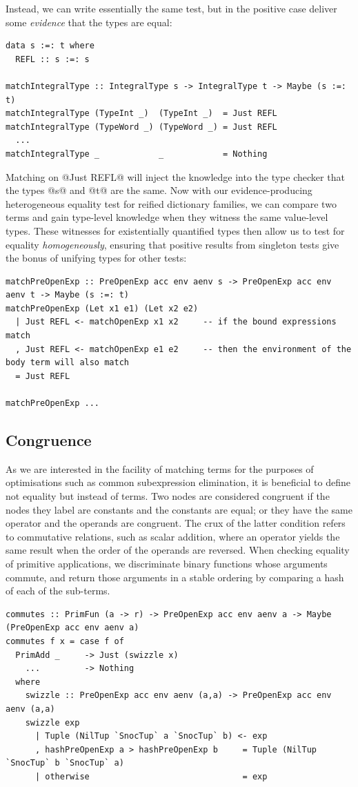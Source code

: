 Instead, we can write essentially the same test, but in the positive case
deliver some \emph{evidence} that the types are equal:
%
\begin{lstlisting}[style=haskell]
data s :=: t where
  REFL :: s :=: s

matchIntegralType :: IntegralType s -> IntegralType t -> Maybe (s :=: t)
matchIntegralType (TypeInt _)  (TypeInt _)  = Just REFL
matchIntegralType (TypeWord _) (TypeWord _) = Just REFL
  ...
matchIntegralType _            _            = Nothing
\end{lstlisting}
%
Matching on @Just REFL@ will inject the knowledge into the type
checker that the types @s@ and @t@ are the same. Now with our
evidence-producing heterogeneous equality test for reified dictionary families,
we can compare two terms and gain type-level knowledge when they witness the
same value-level types. These witnesses for existentially quantified types then
allow us to test for equality \emph{homogeneously}, ensuring that positive
results from singleton tests give the bonus of unifying types for other tests:
%
\begin{lstlisting}[style=haskell]
matchPreOpenExp :: PreOpenExp acc env aenv s -> PreOpenExp acc env aenv t -> Maybe (s :=: t)
matchPreOpenExp (Let x1 e1) (Let x2 e2)
  | Just REFL <- matchOpenExp x1 x2     -- if the bound expressions match
  , Just REFL <- matchOpenExp e1 e2     -- then the environment of the body term will also match
  = Just REFL

matchPreOpenExp ...
\end{lstlisting}


\subsection{Congruence}

As we are interested in the facility of matching terms for the purposes of
optimisations such as common subexpression elimination, it is beneficial to
define not equality but instead  of terms. Two nodes are
considered congruent if the nodes they label are constants and the constants are
equal; or they have the same operator and the operands are congruent. The crux
of the latter condition refers to commutative relations, such as scalar
addition, where an operator yields the same result when the order of the
operands are reversed. When checking equality of primitive applications, we
discriminate binary functions whose arguments commute, and return those
arguments in a stable ordering by comparing a hash of each of the
sub-terms.
%
\begin{lstlisting}[style=haskell]
commutes :: PrimFun (a -> r) -> PreOpenExp acc env aenv a -> Maybe (PreOpenExp acc env aenv a)
commutes f x = case f of
  PrimAdd _     -> Just (swizzle x)
    ...         -> Nothing
  where
    swizzle :: PreOpenExp acc env aenv (a,a) -> PreOpenExp acc env aenv (a,a)
    swizzle exp
      | Tuple (NilTup `SnocTup` a `SnocTup` b) <- exp
      , hashPreOpenExp a > hashPreOpenExp b     = Tuple (NilTup `SnocTup` b `SnocTup` a)
      | otherwise                               = exp
\end{lstlisting}


